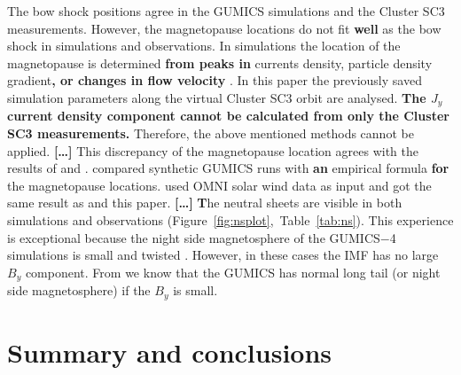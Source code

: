 \documentclass[linenumbers,draft]{agujournal}
\begin{document}
\rm %

The bow shock positions agree in the GUMICS simulations and the Cluster SC3 measurements. However, the magnetopause locations do not fit \textbf{well} as the bow shock in simulations and observations. In simulations the location of the magnetopause is determined \textbf{from peaks in} currents density, particle density gradient\textbf{, or changes in flow velocity} \citep[][see references therein]{siscoe01:_magnet_fluop,garcia07:_findin_lyon_fedder_mobar,gordeev13:_verif_gumic_mhd}. In this paper the previously saved simulation parameters along the virtual Cluster SC3 orbit are analysed. \textbf{The $J_{y}$ current density component cannot be calculated from only the Cluster SC3 measurements.} Therefore, the above mentioned methods cannot be applied. \textbf{[\dots]} This discrepancy of the magnetopause location agrees with the results of \citet{gordeev13:_verif_gumic_mhd} and \citet{facsko16:_one_earth}. \citet{gordeev13:_verif_gumic_mhd} compared synthetic GUMICS runs with \textbf{an} empirical formula \textbf{for} the magnetopause locations. \citet{facsko16:_one_earth} used OMNI solar wind data as input and got the same result as \citet{gordeev13:_verif_gumic_mhd} and this paper. \textbf{[\dots]} \textbf{T}he neutral sheets are visible in both simulations and observations (Figure~\ref{fig:nsplot},~Table~\ref{tab:ns}). This experience is exceptional because the night side magnetosphere of the GUMICS$-$4 simulations is small and twisted \citep{gordeev13:_verif_gumic_mhd,facsko16:_one_earth}. However, in these cases the IMF has no large $B_{y}$ component. From \citet{facsko16:_one_earth} we know that the GUMICS has normal long tail (or night side magnetosphere) if the $B_{y}$ is small.

\section{Summary and conclusions}
\label{sec:concl}
\end{document}
